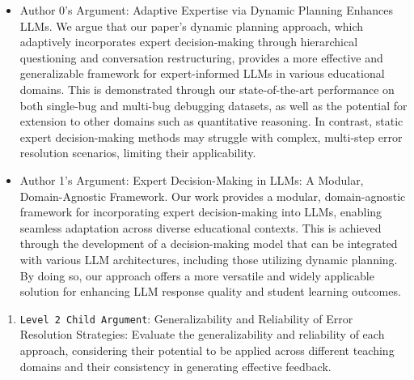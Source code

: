 \begin{enumerate}
\begin{enumerate}
        \begin{itemize}
            \item Author 0's Argument: Adaptive Expertise via Dynamic Planning Enhances LLMs. We argue that our paper's dynamic planning approach, which adaptively incorporates expert decision-making through hierarchical questioning and conversation restructuring, provides a more effective and generalizable framework for expert-informed LLMs in various educational domains. This is demonstrated through our state-of-the-art performance on both single-bug and multi-bug debugging datasets, as well as the potential for extension to other domains such as quantitative reasoning. In contrast, static expert decision-making methods may struggle with complex, multi-step error resolution scenarios, limiting their applicability.
		\item Author 1's Argument: Expert Decision-Making in LLMs: A Modular, Domain-Agnostic Framework. Our work provides a modular, domain-agnostic framework for incorporating expert decision-making into LLMs, enabling seamless adaptation across diverse educational contexts. This is achieved through the development of a decision-making model that can be integrated with various LLM architectures, including those utilizing dynamic planning. By doing so, our approach offers a more versatile and widely applicable solution for enhancing LLM response quality and student learning outcomes.
        \end{itemize}
    \end{enumerate}

    \begin{enumerate}
        \item \texttt{Level 2 Child Argument}: Generalizability and Reliability of Error Resolution Strategies: Evaluate the generalizability and reliability of each approach, considering their potential to be applied across different teaching domains and their consistency in generating effective feedback.


\end{enumerate}
\end{enumerate}
